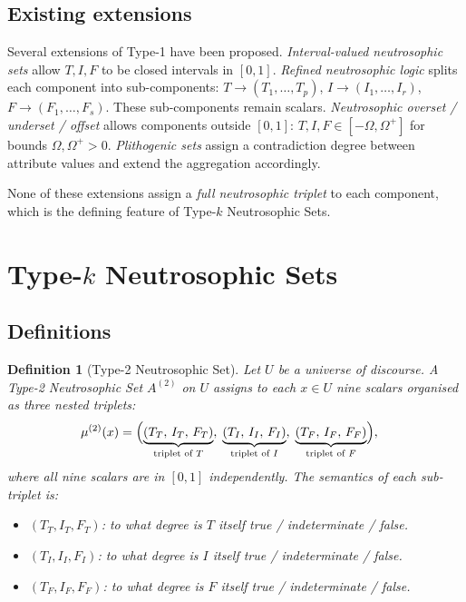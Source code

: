 \documentclass[10pt,a4paper]{article}
\newtheorem{definition}{Definition}
\begin{document}
\subsection{Existing extensions}

Several extensions of Type-1 have been proposed.
\emph{Interval-valued neutrosophic sets}
\cite{wang2010svn} allow $T, I, F$ to be closed intervals
in $[0,1]$. \emph{Refined neutrosophic logic}
\cite{smarandache2013refined} splits each component into
sub-components: $T \to (T_1, \ldots, T_p)$,
$I \to (I_1, \ldots, I_r)$, $F \to (F_1, \ldots, F_s)$.
These sub-components remain scalars.
\emph{Neutrosophic overset / underset / offset}
\cite{smarandache2016overset} allows components outside
$[0,1]$: $T, I, F \in [-\Omega, \Omega^+]$ for bounds
$\Omega, \Omega^+ > 0$.
\emph{Plithogenic sets} \cite{smarandache2018plithogenic}
assign a contradiction degree between attribute values
and extend the aggregation accordingly.

None of these extensions assign a \emph{full neutrosophic
triplet} to each component, which is the defining feature
of Type-$k$ Neutrosophic Sets.

\section{Type-$k$ Neutrosophic Sets}

\subsection{Definitions}

\begin{definition}[Type-2 Neutrosophic Set]
\label{def:type2}
Let $U$ be a universe of discourse. A
\emph{Type-2 Neutrosophic Set} $A^{(2)}$ on $U$ assigns
to each $x \in U$ nine scalars organised as three nested
triplets:
\begin{align}
  \mu^{(2)}(x) &=
  \Bigl(
    \underbrace{(T_T,\, I_T,\, F_T)}_{\text{triplet of } T},\;
    \underbrace{(T_I,\, I_I,\, F_I)}_{\text{triplet of } I},\;
    \underbrace{(T_F,\, I_F,\, F_F)}_{\text{triplet of } F}
  \Bigr),
\end{align}
where all nine scalars are in $[0,1]$ independently.
The \emph{semantics} of each sub-triplet is:
\begin{itemize}
  \item $(T_T, I_T, F_T)$: to what degree is $T$ itself
    true / indeterminate / false.
  \item $(T_I, I_I, F_I)$: to what degree is $I$ itself
    true / indeterminate / false.
  \item $(T_F, I_F, F_F)$: to what degree is $F$ itself
    true / indeterminate / false.
\end{itemize}
\end{definition}
\end{document}
